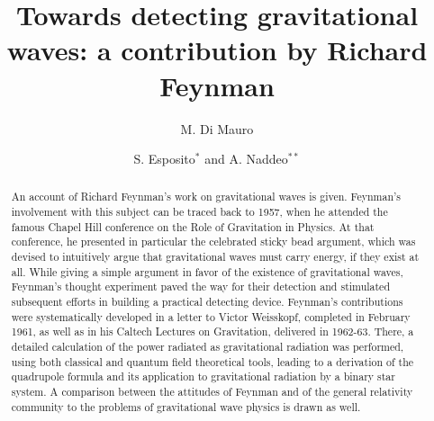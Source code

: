 \documentclass{ws-procs961x669}            %
\begin{document}
\title{Towards detecting gravitational waves: a contribution by Richard Feynman}

\author{M. Di Mauro}

\address{Dipartimento di Matematica, Universit\`a di Salerno,\\
Fisciano, 84084, Italy\\
E-mail: madimauro@unisa.it}

\author{S. Esposito$^*$ and A. Naddeo$^{**}$}

\address{INFN, Sezione di Napoli, C. U. Monte S. Angelo, Via Cinthia,\\
Napoli, 80125, Italy\\
$^*$E-mail: sesposit@na.infn.it\\
$^{**}$E-mail: anaddeo@na.infn.it}


\begin{abstract}
An account of Richard Feynman's work on gravitational waves is
given. Feynman's involvement with this subject can be traced back
to 1957, when he attended the famous Chapel Hill conference on the
Role of Gravitation in Physics. At that conference, he presented
in particular the celebrated sticky bead argument, which was
devised to intuitively argue that gravitational waves must carry
energy, if they exist at all. While giving a simple argument in
favor of the existence of gravitational waves, Feynman's thought
experiment paved the way for their detection and stimulated
subsequent efforts in building a practical detecting device.
Feynman's contributions were systematically developed in a letter
to Victor Weisskopf, completed in February 1961, as well as in his
Caltech Lectures on Gravitation, delivered in 1962-63. There, a
detailed calculation of the power radiated as gravitational
radiation was performed, using both classical and quantum field
theoretical tools, leading to a derivation of the quadrupole
formula and its application to gravitational radiation by a binary
star system. A comparison between the attitudes of Feynman and of
the general relativity community to the problems of gravitational
wave physics is drawn as well.
\end{abstract}


\bodymatter
\end{document}
